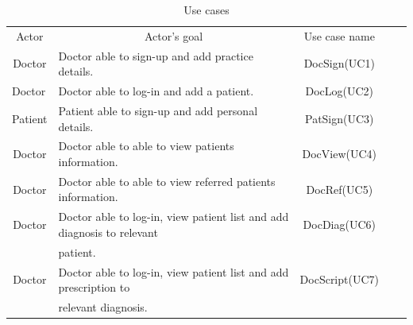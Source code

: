 \documentclass[a4paper]{article}
\begin{document}
\begin{table}[h!]
\centering
\caption*{Use cases}
\label{UseCases}
\begin{tabular}{lllll}
\cline{1-3}
\multicolumn{1}{|c|}{Actor} & \multicolumn{1}{c|}{Actor's goal} & \multicolumn{1}{c|}{Use case name} &  &  \\ \cline{1-3}

\multicolumn{1}{|c|}{Doctor} & \multicolumn{1}{l|}{Doctor able to sign-up and add practice details.} & \multicolumn{1}{c|}{DocSign(UC1)} &  &  \\

\multicolumn{1}{|l|}{Doctor} & \multicolumn{1}{l|}{Doctor able to log-in and add a patient.} & \multicolumn{1}{c|}{DocLog(UC2)} &  &  \\

\multicolumn{1}{|c|}{Patient} & \multicolumn{1}{l|}{Patient able to sign-up and add personal details.} & \multicolumn{1}{c|}{PatSign(UC3)} &  &  \\

\multicolumn{1}{|c|}{Doctor} & \multicolumn{1}{l|}{Doctor able to able to view patients information.} & \multicolumn{1}{c|}{DocView(UC4)} &  &  \\

\multicolumn{1}{|c|}{Doctor} & \multicolumn{1}{l|}{Doctor able to able to view referred patients information.} & \multicolumn{1}{c|}{DocRef(UC5)} &  &  \\ 

\multicolumn{1}{|c|}{Doctor} & \multicolumn{1}{l|}{Doctor able to log-in, view patient list and add diagnosis to relevant} & \multicolumn{1}{c|}{DocDiag(UC6)} &  &  \\ 

\multicolumn{1}{|c|}{} & \multicolumn{1}{l|}{patient.} & \multicolumn{1}{c|}{} &  &  \\

\multicolumn{1}{|c|}{Doctor} & \multicolumn{1}{l|}{Doctor able to log-in, view patient list and add prescription to} & \multicolumn{1}{c|}{DocScript(UC7)} &  &  \\ 

\multicolumn{1}{|c|}{} & \multicolumn{1}{l|}{relevant diagnosis.} & \multicolumn{1}{c|}{} &  &  \\ \cline{1-3}

\end{tabular}
\end{table}

\FloatBarrier
\end{document}
